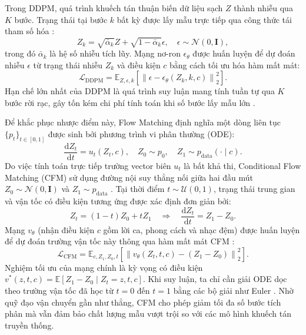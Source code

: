\documentclass[a4paper,13pt,oneside]{report}
\begin{document}
Trong DDPM, quá trình khuếch tán thuận biến dữ liệu sạch $Z$ thành nhiễu qua $K$ bước. Trạng thái tại bước $k$ bất kỳ được lấy mẫu trực tiếp qua công thức tái tham số hóa \cite{ddpm}:
\begin{equation}
 Z_k = \sqrt{\bar{\alpha}_k} Z + \sqrt{1-\bar{\alpha}_k} \epsilon, \quad \epsilon \sim \mathcal{N}(0, \mathbf{I}),
 \label{eq:ddpm_reparam}
\end{equation}
trong đó $\bar{\alpha}_k$ là hệ số nhiễu tích lũy. Mạng nơ-ron $\epsilon_\theta$ được huấn luyện để dự đoán nhiễu $\epsilon$ từ trạng thái nhiễu $Z_k$ và điều kiện $c$ bằng cách tối ưu hóa hàm mất mát:
\begin{equation}
 \mathcal{L}_{\mathrm{DDPM}} = \mathbb{E}_{Z,\epsilon,k} \left[ \left\| \epsilon - \epsilon_\theta(Z_k, k, c) \right\|_2^2 \right].
 \label{eq:ddpm_loss}
\end{equation}
Hạn chế lớn nhất của DDPM là quá trình suy luận mang tính tuần tự qua $K$ bước rời rạc, gây tốn kém chi phí tính toán khi số bước lấy mẫu lớn \cite{ddpm}.

Để khắc phục nhược điểm này, Flow Matching định nghĩa một dòng liên tục $\{p_t\}_{t\in[0,1]}$ được sinh bởi phương trình vi phân thường (ODE):
\begin{equation}
 \frac{\mathrm{d}Z_t}{\mathrm{d}t} = u_t(Z_t,c), \quad Z_0 \sim p_0, \quad Z_1 \sim p_{\mathrm{data}}(\cdot \mid c).
 \label{eq:fm_ode}
\end{equation}
Do việc tính toán trực tiếp trường vector biên $u_t$ là bất khả thi, Conditional Flow Matching (CFM) sử dụng đường nội suy thẳng nối giữa hai đầu mút $Z_0 \sim \mathcal{N}(0, \mathbf{I})$ và $Z_1 \sim p_{\mathrm{data}}$ \cite{flowmatching}. Tại thời điểm $t \sim \mathcal{U}(0,1)$, trạng thái trung gian và vận tốc có điều kiện tương ứng được xác định đơn giản bởi:
\begin{equation}
 Z_t = (1-t)Z_0 + tZ_1 \quad \Rightarrow \quad \frac{\mathrm{d}Z_t}{\mathrm{d}t} = Z_1 - Z_0.
 \label{eq:cfm_interpolation}
\end{equation}
Mạng $v_\theta$ (nhận điều kiện $c$ gồm lời ca, phong cách và nhạc đệm) được huấn luyện để dự đoán trường vận tốc này thông qua hàm mất mát CFM \cite{flowmatching}:
\begin{equation}
 \mathcal{L}_{\mathrm{CFM}} = \mathbb{E}_{c,Z_1,Z_0,t} \left[ \left\| v_\theta(Z_t, t, c) - (Z_1 - Z_0) \right\|_2^2 \right].
 \label{eq:cfm_loss}
\end{equation}
Nghiệm tối ưu của mạng chính là kỳ vọng có điều kiện $v^*(z,t,c) = \mathbb{E}[Z_1 - Z_0 \mid Z_t = z, t, c]$. Khi suy luận, ta chỉ cần giải ODE dọc theo trường vận tốc đã học từ $t=0$ đến $t=1$ bằng các bộ giải như Euler \cite{flowmatching}. Nhờ quỹ đạo vận chuyển gần như thẳng, CFM cho phép giảm tối đa số bước tích phân mà vẫn đảm bảo chất lượng mẫu vượt trội so với các mô hình khuếch tán truyền thống.
\end{document}
